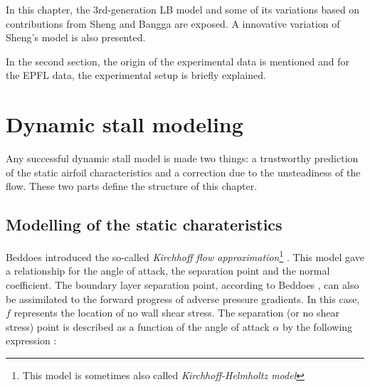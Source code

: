 In this chapter, the 3rd-generation LB model \cite{leishman_semi-empirical_1989} and some of its variations based on contributions from Sheng \cite{sheng_modified_2008} and Bangga \cite{bangga_improved_2020} are exposed. A innovative variation of Sheng's model is also presented. 

In the second section, the origin of the experimental data is mentioned and for the EPFL data, the experimental setup is briefly explained.

\section{Dynamic stall modeling}

Any successful dynamic stall model is made two things: a trustworthy prediction of the static airfoil characteristics and a correction due to the unsteadiness of the flow. These two parts define the structure of this chapter. 

\subsection{Modelling of the static charateristics}
\label{section:kirchhoff}

Beddoes introduced the so-called \textit{Kirchhoff flow approximation}\footnote{This model is sometimes also called \textit{Kirchhoff-Helmholtz model}} \cite{beddoes_representation_1983}. This model gave a relationship for the angle of attack, the separation point and the normal coefficient. The boundary layer separation point, according to Beddoes \cite{beddoes_representation_1983}, can also be assimilated to the forward progress of adverse pressure gradients. In this case, $f$ represents the location of no wall shear stress.
The separation (or no shear stress) point is described as a function of the angle of attack $\alpha$ by the following expression : 

